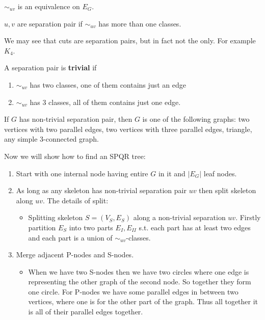 \begin{fact}
	$\sim_{uv}$ is an equivalence on $E_G$.
\end{fact}

\begin{defn}
	$u,v$ are separation pair if $\sim_{uv}$ has more than one classes.
\end{defn}

We may see that cuts are separation pairs, but in fact not the only. For example $K_4$.

\begin{defn}
	A separation pair is \textbf{trivial} if
	
	\begin{enumerate}
		\item $\sim_{uv}$ has two classes, one of them contains just an edge
		\item $\sim_{uv}$ has 3 classes, all of them contains just one edge.
	\end{enumerate}
\end{defn}

\begin{observ}
	If $G$ has non-trivial separation pair, then $G$ is one of the following graphs: two vertices with two parallel edges, two vertices with three parallel edges, triangle, any simple 3-connected graph.
\end{observ}

\noindent Now we will show how to find an SPQR tree:

\begin{enumerate}
	\item Start with one internal node having entire $G$ in it and $|E_G|$ leaf nodes.
	\item As long as any skeleton has non-trivial separation pair $uv$ then split skeleton along $uv$. The details of split:
	
	\begin{itemize}
		\item Splitting skeleton $S = (V_S, E_S)$ along a non-trivial separation $uv$. Firstly partition $E_S$ into two parts $E_{I}, E_{II}$ s.t. each part has at least two edges and each part is a union of $\sim_{uv}$-classes.
	\end{itemize}
	
	\item Merge adjacent P-nodes and S-nodes.
	
	\begin{itemize}
		\item When we have two S-nodes then we have two circles where one edge is representing the other graph of the second node. So together they form one circle. For P-nodes we have some parallel edges in between two vertices, where one is for the other part of the graph. Thus all together it is all of their parallel edges together.
	\end{itemize}
\end{enumerate}

